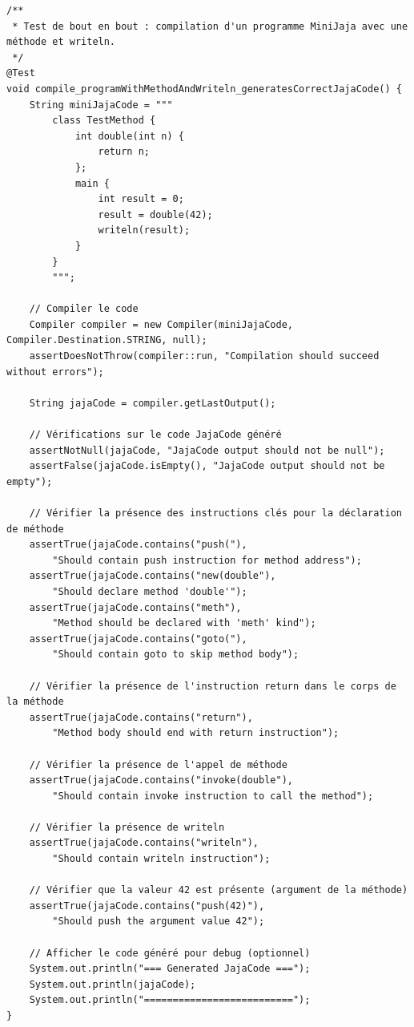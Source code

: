 \begin{verbatim}
/**
 * Test de bout en bout : compilation d'un programme MiniJaja avec une méthode et writeln.
 */
@Test
void compile_programWithMethodAndWriteln_generatesCorrectJajaCode() {
    String miniJajaCode = """
        class TestMethod {
            int double(int n) {
                return n;
            };
            main {
                int result = 0;
                result = double(42);
                writeln(result);
            }
        }
        """;

    // Compiler le code
    Compiler compiler = new Compiler(miniJajaCode, Compiler.Destination.STRING, null);
    assertDoesNotThrow(compiler::run, "Compilation should succeed without errors");

    String jajaCode = compiler.getLastOutput();

    // Vérifications sur le code JajaCode généré
    assertNotNull(jajaCode, "JajaCode output should not be null");
    assertFalse(jajaCode.isEmpty(), "JajaCode output should not be empty");

    // Vérifier la présence des instructions clés pour la déclaration de méthode
    assertTrue(jajaCode.contains("push("),
        "Should contain push instruction for method address");
    assertTrue(jajaCode.contains("new(double"),
        "Should declare method 'double'");
    assertTrue(jajaCode.contains("meth"),
        "Method should be declared with 'meth' kind");
    assertTrue(jajaCode.contains("goto("),
        "Should contain goto to skip method body");

    // Vérifier la présence de l'instruction return dans le corps de la méthode
    assertTrue(jajaCode.contains("return"),
        "Method body should end with return instruction");

    // Vérifier la présence de l'appel de méthode
    assertTrue(jajaCode.contains("invoke(double"),
        "Should contain invoke instruction to call the method");

    // Vérifier la présence de writeln
    assertTrue(jajaCode.contains("writeln"),
        "Should contain writeln instruction");

    // Vérifier que la valeur 42 est présente (argument de la méthode)
    assertTrue(jajaCode.contains("push(42)"),
        "Should push the argument value 42");

    // Afficher le code généré pour debug (optionnel)
    System.out.println("=== Generated JajaCode ===");
    System.out.println(jajaCode);
    System.out.println("==========================");
}
\end{verbatim}

